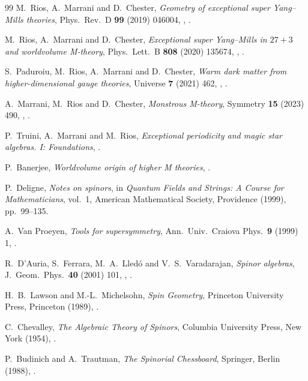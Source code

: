 \begin{thebibliography}{99}
M.~Rios, A.~Marrani and D.~Chester, \textit{Geometry of exceptional super Yang--Mills theories}, Phys.\ Rev.\ D \textbf{99} (2019) 046004, , .

M.~Rios, A.~Marrani and D.~Chester, \textit{Exceptional super Yang--Mills in $27+3$ and worldvolume M-theory}, Phys.\ Lett.\ B \textbf{808} (2020) 135674, , .

S.~Paduroiu, M.~Rios, A.~Marrani and D.~Chester, \textit{Warm dark matter from higher-dimensional gauge theories}, Universe \textbf{7} (2021) 462, , .

A.~Marrani, M.~Rios and D.~Chester, \textit{Monstrous M-theory}, Symmetry \textbf{15} (2023) 490, , .

P.~Truini, A.~Marrani and M.~Rios, \textit{Exceptional periodicity and magic star algebras. I: Foundations}, .

P.~Banerjee, \textit{Worldvolume origin of higher M theories}, .

P.~Deligne, \textit{Notes on spinors}, in \textit{Quantum Fields and Strings: A Course for Mathematicians}, vol.~1, American Mathematical Society, Providence (1999), pp.~99--135.

A.~Van Proeyen, \textit{Tools for supersymmetry}, Ann.\ Univ.\ Craiova Phys.\ \textbf{9} (1999) 1, .

R.~D'Auria, S.~Ferrara, M.~A.~Lled\'o and V.~S.~Varadarajan, \textit{Spinor algebras}, J.\ Geom.\ Phys.\ \textbf{40} (2001) 101, , .

H.~B.~Lawson and M.-L.~Michelsohn, \textit{Spin Geometry}, Princeton University Press, Princeton (1989), .

C.~Chevalley, \textit{The Algebraic Theory of Spinors}, Columbia University Press, New York (1954), .

P.~Budinich and A.~Trautman, \textit{The Spinorial Chessboard}, Springer, Berlin (1988), .


\end{thebibliography}
